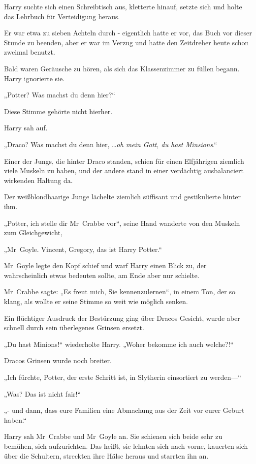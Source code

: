 {Harry suchte sich einen Schreibtisch aus, kletterte hinauf, setzte sich und holte das Lehrbuch für Verteidigung heraus.

Er war etwa zu sieben Achteln durch - eigentlich hatte er vor, das Buch vor dieser Stunde zu beenden, aber er war im Verzug und hatte den Zeitdreher heute schon zweimal benutzt.

Bald waren Geräusche zu hören, als sich das Klassenzimmer zu füllen begann. Harry ignorierte sie.

„Potter? Was machst du denn hier?“

Diese Stimme gehörte nicht hierher.

Harry sah auf.

„Draco? Was machst du denn hier, …\emph{oh mein Gott, du hast Minsions}.“

Einer der Jungs, die hinter Draco standen, schien für einen Elfjährigen ziemlich viele Muskeln zu haben, und der andere stand in einer verdächtig ausbalanciert wirkenden Haltung da.

Der weißblondhaarige Junge lächelte ziemlich süffisant und gestikulierte hinter ihm.

„Potter, ich stelle dir Mr~Crabbe vor“, seine Hand wanderte von den Muskeln zum Gleichgewicht,

„Mr~Goyle. Vincent, Gregory, das ist Harry Potter.“

Mr~Goyle legte den Kopf schief und warf Harry einen Blick zu, der wahrscheinlich etwas bedeuten sollte, am Ende aber nur schielte.

Mr~Crabbe sagte: „Es freut mich, Sie kennenzulernen“, in einem Ton, der so klang, als wollte er seine Stimme so weit wie möglich senken.

Ein flüchtiger Ausdruck der Bestürzung ging über Dracos Gesicht, wurde aber schnell durch sein überlegenes Grinsen ersetzt.

„Du hast Minions!“ wiederholte Harry. „Woher bekomme ich auch welche?!“

Dracos Grinsen wurde noch breiter.

„Ich fürchte, Potter, der erste Schritt ist, in Slytherin einsortiert zu werden—“

„Was? Das ist nicht fair!“

„- und dann, dass eure Familien eine Abmachung aus der Zeit vor eurer Geburt haben.“

Harry sah Mr~Crabbe und Mr~Goyle an. Sie schienen sich beide sehr zu bemühen, sich aufzurichten. Das heißt, sie lehnten sich nach vorne, kauerten sich über die Schultern, streckten ihre Hälse heraus und starrten ihn an.

}
